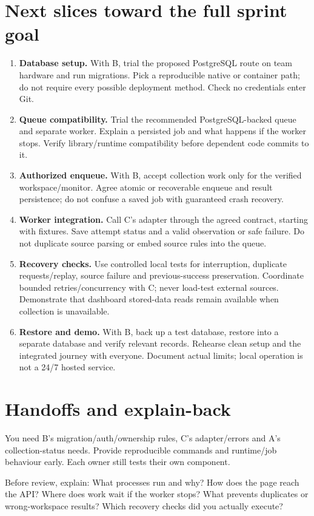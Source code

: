 \section*{Next slices toward the full sprint goal}
\begin{enumerate}
\item \textbf{Database setup.} With B, trial the proposed PostgreSQL route on team hardware and run migrations. Pick a reproducible native or container path; do not require every possible deployment method. Check no credentials enter Git.
\item \textbf{Queue compatibility.} Trial the recommended PostgreSQL-backed queue and separate worker. Explain a persisted job and what happens if the worker stops. Verify library/runtime compatibility before dependent code commits to it.
\item \textbf{Authorized enqueue.} With B, accept collection work only for the verified workspace/monitor. Agree atomic or recoverable enqueue and result persistence; do not confuse a saved job with guaranteed crash recovery.
\item \textbf{Worker integration.} Call C's adapter through the agreed contract, starting with fixtures. Save attempt status and a valid observation or safe failure. Do not duplicate source parsing or embed source rules into the queue.
\item \textbf{Recovery checks.} Use controlled local tests for interruption, duplicate requests/replay, source failure and previous-success preservation. Coordinate bounded retries/concurrency with C; never load-test external sources. Demonstrate that dashboard stored-data reads remain available when collection is unavailable.
\item \textbf{Restore and demo.} With B, back up a test database, restore into a separate database and verify relevant records. Rehearse clean setup and the integrated journey with everyone. Document actual limits; local operation is not a 24/7 hosted service.
\end{enumerate}
\section*{Handoffs and explain-back}
You need B's migration/auth/ownership rules, C's adapter/errors and A's collection-status needs. Provide reproducible commands and runtime/job behaviour early. Each owner still tests their own component.

Before review, explain: What processes run and why? How does the page reach the API? Where does work wait if the worker stops? What prevents duplicates or wrong-workspace results? Which recovery checks did you actually execute?
\sharedfinish
